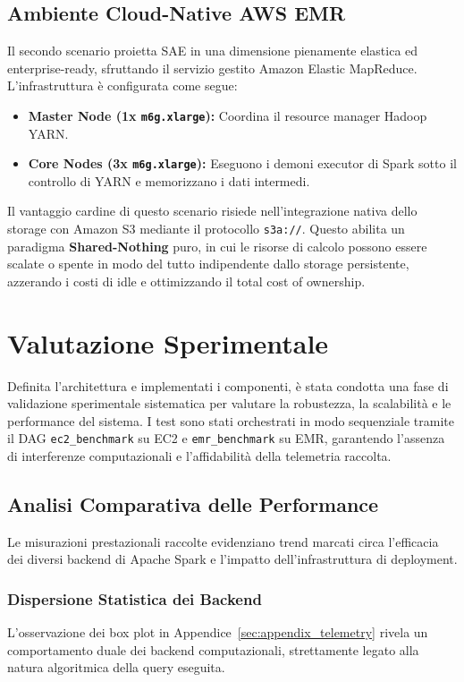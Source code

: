 \documentclass[conference]{IEEEtran}
\begin{document}
\subsection{Ambiente Cloud-Native AWS EMR}
Il secondo scenario proietta SAE in una dimensione pienamente elastica ed enterprise-ready, sfruttando il servizio gestito Amazon Elastic MapReduce.
L'infrastruttura è configurata come segue:
\begin{itemize}
    \item \textbf{Master Node (1x \texttt{m6g.xlarge}):} Coordina il resource manager Hadoop YARN.
    \item \textbf{Core Nodes (3x \texttt{m6g.xlarge}):} Eseguono i demoni executor di Spark sotto il controllo di YARN e memorizzano i dati intermedi.
\end{itemize}
Il vantaggio cardine di questo scenario risiede nell'integrazione nativa dello storage con Amazon S3 mediante il protocollo \texttt{s3a://}.
Questo abilita un paradigma \textbf{Shared-Nothing} puro, in cui le risorse di calcolo possono essere scalate o spente in modo del tutto indipendente dallo storage persistente, azzerando i costi di idle e ottimizzando il total cost of ownership\@.


\section{Valutazione Sperimentale}\label{sec:experimental_evaluation}
Definita l'architettura e implementati i componenti, è stata condotta una fase di validazione sperimentale sistematica per valutare la robustezza, la scalabilità e le performance del sistema.
I test sono stati orchestrati in modo sequenziale tramite il DAG \texttt{ec2\_benchmark} su EC2 e \texttt{emr\_benchmark} su EMR, garantendo l'assenza di interferenze computazionali e l'affidabilità della telemetria raccolta.

\subsection{Analisi Comparativa delle Performance}\label{subsec:performance_analysis}
Le misurazioni prestazionali raccolte evidenziano trend marcati circa l'efficacia dei diversi backend di Apache Spark e l'impatto dell'infrastruttura di deployment.

\subsubsection{Dispersione Statistica dei Backend}
L'osservazione dei box plot in Appendice~\ref{sec:appendix_telemetry} rivela un comportamento duale dei backend computazionali, strettamente legato alla natura algoritmica della query eseguita.
\end{document}
